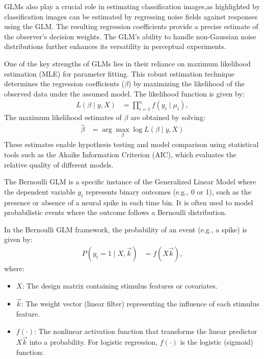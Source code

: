 GLMs also play a crucial role in estimating classification images,as highlighted by \cite{murray_classification_2011} classification images can be estimated by regressing noise fields against responses using the GLM. The resulting regression coefficients provide a precise estimate of the observer's decision weights.
The GLM’s ability to handle non-Gaussian noise distributions further enhances its versatility in perceptual experiments.

One of the key strengths of GLMs lies in their reliance on maximum likelihood estimation (MLE) for parameter fitting. This robust estimation technique determines the regression coefficients ($\beta$) by maximizing the likelihood of the observed data under the assumed model. The likelihood function is given by:
\begin{align}
L(\beta \mid y, X)& = \prod_{i=1}^{n} f(y_i \mid \mu_i),
\end{align}
The maximum likelihood estimates of $\beta$
are obtained by solving:
\begin{align}
\hat{\beta}& = \arg \max_{\beta} \log L(\beta \mid y, X) 
\end{align}
These estimates enable hypothesis testing and model comparison using statistical tools such as the Akaike Information Criterion (AIC), which evaluates the relative quality of different models.


The Bernoulli GLM is a specific instance of the Generalized Linear Model where the dependent variable $y_t$ represents binary outcomes (e.g., 0 or 1), such as the presence or absence of a neural spike in each time bin. It is often used to model probabilistic events where the outcome follows a Bernoulli distribution.

In the Bernoulli GLM framework, the probability of an event (e.g., a spike) is given by:
\begin{align}
P(y_t = 1 \mid X, \vec{k}) &= f(X \vec{k}),
\end{align}
where:
\begin{itemize}
\item  $X$: The design matrix containing stimulus features or covariates.
\item $\vec{k}$: The weight vector (linear filter) representing the influence of each stimulus feature.
\item $f(\cdot)$: The nonlinear activation function that transforms the linear predictor $X \vec{k}$ into a probability. For logistic regression, $f(\cdot)$ is the logistic (sigmoid) function:
\end{itemize} 
  

